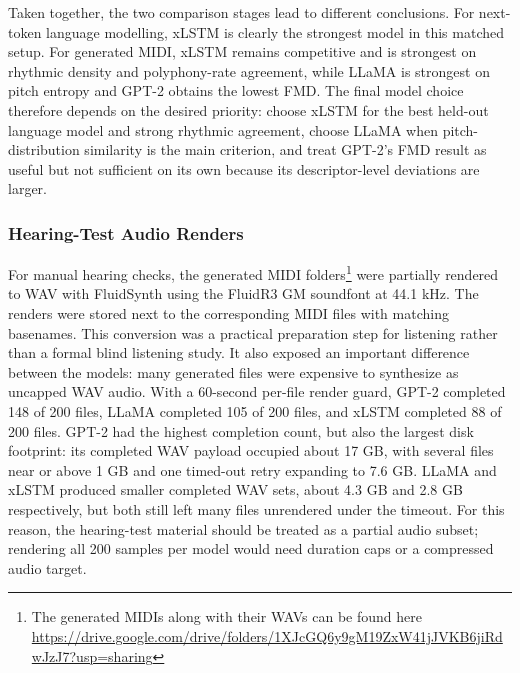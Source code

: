 Taken together, the two comparison stages lead to different conclusions. For
next-token language modelling, xLSTM is clearly the strongest model in this
matched setup. For generated MIDI, xLSTM remains competitive and is strongest on
rhythmic density and polyphony-rate agreement, while LLaMA is strongest on pitch
entropy and GPT-2 obtains the lowest FMD. The final model choice therefore
depends on the desired priority: choose xLSTM for the best held-out language
model and strong rhythmic agreement, choose LLaMA when pitch-distribution
similarity is the main criterion, and treat GPT-2's FMD result as useful but not
sufficient on its own because its descriptor-level deviations are larger.

\subsubsection{Hearing-Test Audio Renders}

For manual hearing checks, the generated MIDI folders\footnote{The generated MIDIs along with their WAVs can be found here \url{https://drive.google.com/drive/folders/1XJcGQ6y9gM19ZxW41jJVKB6jiRdwJzJ7?usp=sharing}} were partially rendered to
WAV with FluidSynth using the FluidR3 GM soundfont at 44.1 kHz. The renders were
stored next to the corresponding MIDI files with matching basenames. This
conversion was a practical preparation step for listening rather than a formal
blind listening study. It also exposed an important difference between the
models: many generated files were expensive to synthesize as uncapped WAV audio.
With a 60-second per-file render guard, GPT-2 completed 148 of 200 files, LLaMA
completed 105 of 200 files, and xLSTM completed 88 of 200 files. GPT-2 had the
highest completion count, but also the largest disk footprint: its completed WAV
payload occupied about 17 GB, with several files near or above 1 GB and one
timed-out retry expanding to 7.6 GB. LLaMA and xLSTM produced smaller completed
WAV sets, about 4.3 GB and 2.8 GB respectively, but both still left many files
unrendered under the timeout. For this reason, the hearing-test material should
be treated as a partial audio subset; rendering all 200 samples per model would
need duration caps or a compressed audio target.
